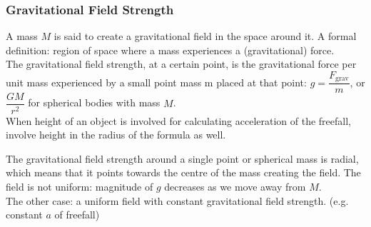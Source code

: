\subsubsection*{Gravitational Field Strength}
A mass $M$ is said to create a gravitational field in the space around it. 
A formal definition: region of space where a mass experiences a (gravitational) force.\\
The gravitational field strength, at a certain point, is the gravitational force per unit mass experienced by a small point mass m placed at that point: $g=\dfrac{F_\text{grav}}{m}$, or $\dfrac{GM}{r^2}$ for spherical bodies with mass $M$.\\
When height of an object is involved for calculating acceleration of the freefall, involve height in the radius of the formula as well.
\begin{center}
\end{center}
The gravitational field strength around a single point or spherical mass is radial, which means that it points towards the centre of the mass creating the field. The field is not uniform: magnitude of $g$ decreases as we move away from $M$. \\
The other case: a uniform field with constant gravitational field strength. (e.g. constant $a$ of freefall)
